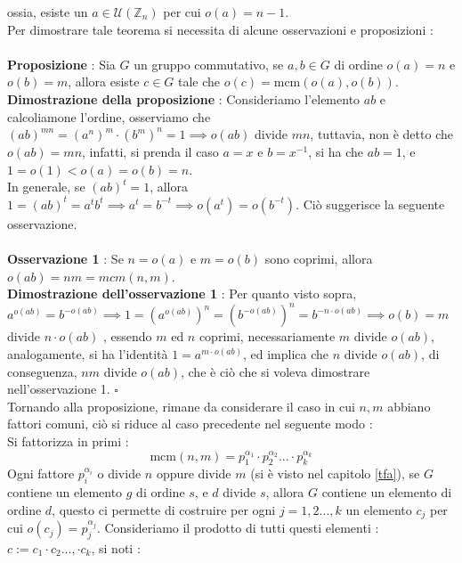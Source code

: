 \documentclass[12pt, letterpaper]{article}
\newcommand{\Z}{{\mathbb Z}}
\newcommand{\mcm}{{\text{mcm}}}
\begin{document}
ossia, esiste 
un \(a\in\mathcal{U}(\Z_n)\) per cui \(o(a)=n-1\).
\\Per dimostrare tale teorema si necessita di alcune osservazioni e proposizioni :\\\hphantom{}\\ 
\textbf{Proposizione} : Sia \(G\) un gruppo commutativo, se \(a,b\in G\) di 
ordine \(o(a)=n\) e \(o(b)=m\), allora esiste \(c\in G\) tale che 
\(o(c)=\mcm(o(a),o(b))\).\\
\textbf{Dimostrazione della proposizione} : Consideriamo l'elemento \(ab\) e calcoliamone l'ordine, 
osserviamo che \((ab)^{mn}=(a^n)^m\cdot (b^m)^n=1\implies o(ab)\) divide \(mn\), tuttavia, non è 
detto che \(o(ab)=mn\), infatti, si prenda il caso \(a=x\) e \(b=x^{-1}\), si ha che 
\(ab=1\), e \(1=o(1)<o(a)=o(b)=n\).\\ In generale, se \((ab)^t=1\), allora 
\(1=(ab)^t=a^tb^t\implies a^t=b^{-t}\implies o(a^t)=o(b^{-t})\). Ciò suggerisce la 
seguente osservazione.\\\hphantom{}\\
\textbf{Osservazione 1} : Se \(n=o(a)\) e \(m=o(b)\) sono coprimi, allora \(o(ab)=nm=mcm(n,m)\).\\
\textbf{Dimostrazione dell'osservazione 1} : Per quanto visto sopra, \(a^{o(ab)}=b^{-o(ab)}
\implies 1=(a^{o(ab)})^n=(b^{-o(ab)})^n =b^{-n \cdot o(ab)}\implies o(b)=m\) divide \(n\cdot o(ab)\)
, essendo \(m\) ed \(n\) coprimi, necessariamente \(m\) divide \(o(ab)\), analogamente, 
si ha l'identità \(1=a^{m\cdot o(ab)}\), ed implica che \(n\) divide \(o(ab)\), di conseguenza,
\(nm\) divide \(o(ab)\), che è ciò che si voleva dimostrare nell'osservazione 1. \(\square\)
\\Tornando alla proposizione, rimane da considerare il caso in cui \(n,m\) abbiano fattori 
comuni, ciò si riduce al caso precedente nel seguente modo :\\
Si fattorizza in primi : \begin{equation}
    \mcm(n,m)=p_1^{\alpha_1}\cdot p_2^{\alpha_2}...\cdot p_k^{\alpha_k}
\end{equation} 
Ogni fattore \(p_i^{\alpha_i}\) o divide \(n\) oppure divide \(m\) (si è visto nel capitolo \ref{tfa}), se 
\(G\) contiene un elemento \(g\) di ordine \(s\), e \(d\) divide \(s\), allora 
\(G\) contiene un elemento di ordine \(d\), questo ci permette di costruire per 
ogni \(j=1,2...,k\) un elemento \(c_j\) per cui \(o(c_j)= p_j^{\alpha_j}\). Consideriamo 
il prodotto di tutti questi elementi : \(c:=c_1\cdot c_2...,\cdot c_k\), si noti :\\\hphantom{}\\
\end{document}
